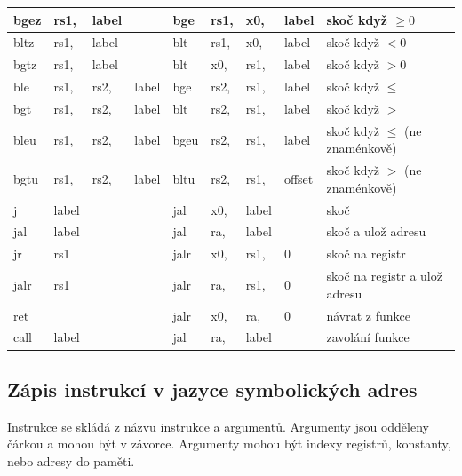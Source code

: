 \documentclass[FM,BP]{tulthesis}
\begin{document}
\begin{table}[h]
\begin{center}
{\begin{tabular}{|llll|llll|l|}
        \\
        \hline
        bgez &rs1, &label &&
        bge &rs1, &x0, &label & 
        skoč když $\ge 0$        
        \\
        \hline
        bltz &rs1, &label &&
        blt &rs1, &x0,& label & 
        skoč když $< 0$
        \\
        \hline
        bgtz &rs1, &label &&  
        blt &x0, &rs1, &label & 
        skoč když $> 0$
        \\
        \hline
        ble &rs1, &rs2, &label &  
        bge &rs2, &rs1, &label & 
        skoč když $\le$
        \\
        \hline
        bgt &rs1, &rs2, &label &  
        blt &rs2, &rs1, &label & 
        skoč když $>$
        \\
        \hline
        bleu &rs1, &rs2, &label &  
        bgeu &rs2, &rs1, &label & 
        skoč když $\le$ (ne znaménkově)
        \\
        \hline
        bgtu &rs1, &rs2, &label &  
        bltu &rs2, &rs1, &offset & 
        skoč když $>$ (ne znaménkově)
        \\
        \hline
        j & label &&&  
        jal &x0, &label & &
        skoč        
        \\
        \hline
        jal &label &&&  
        jal &ra, &label & &
        skoč a ulož adresu
        \\
        \hline
        jr &rs1 &&&
        jalr &x0, &rs1, &0 & 
        skoč na registr
        \\
        \hline
        jalr &rs1 &&&  
        jalr &ra, &rs1,& 0 & 
        skoč na registr a ulož adresu
        \\
        \hline
        ret & &&&
        jalr &x0, &ra,& 0 & 
        návrat z funkce
        \\
        \hline
        call &label &&&  
        jal &ra, &label && 
        zavolání funkce
        \\
        \hline
        \end{tabular}
    }
    \end{center}
\end{table}

\subsection{Zápis instrukcí v jazyce symbolických adres}
Instrukce se skládá z názvu instrukce a argumentů. Argumenty jsou odděleny čárkou a mohou být v závorce. Argumenty mohou být indexy registrů, konstanty, nebo adresy do paměti. 
\end{document}
